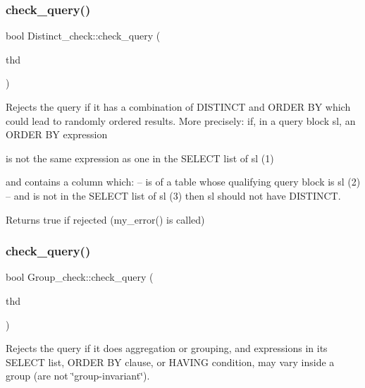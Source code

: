\subsubsection{\texorpdfstring{check\+\_\+query()}{check\_query()}\hspace{0.1cm}{\footnotesize\ttfamily [1/2]}}
{\footnotesize\ttfamily bool Distinct\+\_\+check\+::check\+\_\+query (\begin{DoxyParamCaption}\item[{T\+HD $\ast$}]{thd }\end{DoxyParamCaption})}

Rejects the query if it has a combination of D\+I\+S\+T\+I\+N\+CT and O\+R\+D\+ER BY which could lead to randomly ordered results. More precisely\+: if, in a query block \textquotesingle{}sl\textquotesingle{}, an O\+R\+D\+ER BY expression
\begin{DoxyItemize}
\item is not the same expression as one in the S\+E\+L\+E\+CT list of \textquotesingle{}sl\textquotesingle{} (1)
\item and contains a column which\+: -- is of a table whose qualifying query block is \textquotesingle{}sl\textquotesingle{} (2) -- and is not in the S\+E\+L\+E\+CT list of \textquotesingle{}sl\textquotesingle{} (3) then \textquotesingle{}sl\textquotesingle{} should not have D\+I\+S\+T\+I\+N\+CT.
\end{DoxyItemize}

\begin{DoxyReturn}{Returns}
true if rejected (my\+\_\+error() is called) 
\end{DoxyReturn}
\mbox{\label{group__AGGREGATE__CHECKS_ga85f98a122e6f9accf528534acb5db686}} 
\subsubsection{\texorpdfstring{check\+\_\+query()}{check\_query()}\hspace{0.1cm}{\footnotesize\ttfamily [2/2]}}
{\footnotesize\ttfamily bool Group\+\_\+check\+::check\+\_\+query (\begin{DoxyParamCaption}\item[{T\+HD $\ast$}]{thd }\end{DoxyParamCaption})}

Rejects the query if it does aggregation or grouping, and expressions in its S\+E\+L\+E\+CT list, O\+R\+D\+ER BY clause, or H\+A\+V\+I\+NG condition, may vary inside a group (are not \char`\"{}group-\/invariant\char`\"{}). 